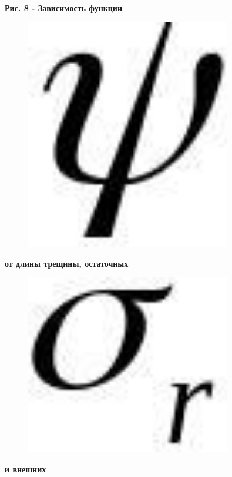 {\bfseries Рис. 8 - Зависимость функции}
\begin{figure}[H]
	\centering
	\includegraphics[width=0.8\textwidth]{assets/1238}
	\caption*{}
\end{figure} {\bfseries от длины трещины,
остаточных} \begin{figure}[H]
	\centering
	\includegraphics[width=0.8\textwidth]{assets/1239}
	\caption*{}
\end{figure} {\bfseries и внешних}
